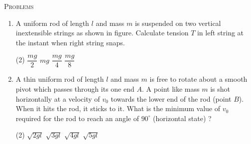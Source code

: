 \documentclass[11pt]{article}
\begin{document}
\begin{center}
    \textsc{Problems}
\end{center}
\begin{enumerate}

   \item A uniform rod of length $l$ and mass $m$ is suspended on two vertical inextensible strings as shown in figure. Calculate tension $T$ in left string at the instant when right string snaps. 
   
   \begin{center}
    \end{center}
    \begin{tasks}(2)
        \task $\dfrac{mg}{2}$
        \task $mg$
        \task $\dfrac{mg}{4}$\ans
        \task $\dfrac{mg}{8}$
    \end{tasks}

    \item A thin uniform rod of length $l$ and mass $m$ is free to rotate about a smooth pivot which passes through its one end $A$. A point like mass $m$ is shot horizontally at a velocity of $v_0$ towards the lower end of the rod (point $B$). When it hits the rod, it sticks to it. What is the minimum value of $v_0$ required for the rod to reach an angle of $90^\circ$ (horizontal state) ?
    \begin{center}
        \end{center}
    \begin{tasks}(2)
        \task $\sqrt{2gl}$
        \task $\sqrt{3gl}$
        \task $\sqrt{4gl}$\ans
        \task $\sqrt{5gl}$
    \end{tasks}


\end{enumerate}
\end{document}
